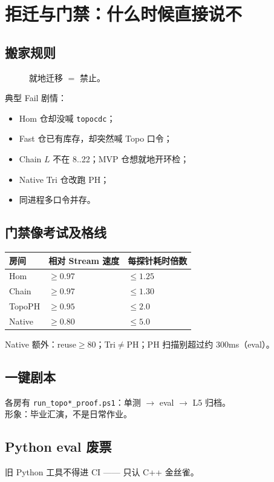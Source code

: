 \chapter{拒迁与门禁：什么时候直接说不}
\label{ch:deny}

\section{搬家规则}

\begin{figure}[htbp]
\centering
{}
\caption{就地迁移 $=$ 禁止。}
\label{fig:move}
\end{figure}

典型 Fail 剧情：
\begin{itemize}[nosep]
  \item Hom 仓却没喊 \texttt{topocdc}；
  \item Fast 仓已有库存，却突然喊 Topo 口令；
  \item Chain $L$ 不在 8..22；MVP 仓想就地开环检；
  \item Native Tri 仓改跑 PH；
  \item 同进程多口令并存。
\end{itemize}

\section{门禁像考试及格线}

\begin{center}
\small
\begin{tabular}{@{}lll@{}}
\toprule
房间 & 相对 Stream 速度 & 每探针耗时倍数 \\
\midrule
Hom & $\ge0.97$ & $\le1.25$ \\
Chain & $\ge0.97$ & $\le1.30$ \\
TopoPH & $\ge0.95$ & $\le2.0$ \\
Native & $\ge0.80$ & $\le5.0$ \\
\bottomrule
\end{tabular}
\end{center}

Native 额外：reuse$\ge80$；Tri$\neq$PH；PH 扫描别超过约 300ms（eval）。

\section{一键剧本}

各房有 \texttt{run\_topo*\_proof.ps1}：单测 $\to$ eval $\to$ L5 归档。\\
形象：毕业汇演，不是日常作业。

\section{Python eval 废票}

旧 Python 工具不得进 CI —— 只认 C++ 金丝雀。
